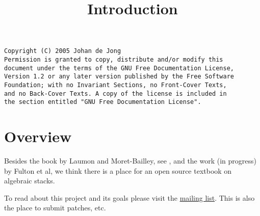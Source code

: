 

%


\title{Introduction}


\maketitle

\begin{verbatim}
Copyright (C) 2005 Johan de Jong
Permission is granted to copy, distribute and/or modify this
document under the terms of the GNU Free Documentation License,
Version 1.2 or any later version published by the Free Software
Foundation; with no Invariant Sections, no Front-Cover Texts,
and no Back-Cover Texts. A copy of the license is included in
the section entitled "GNU Free Documentation License".
\end{verbatim}

\tableofcontents

\section{Overview}
\label{section-overview}

\noindent
Besides the book by Laumon and Moret-Bailley, see \cite{LM-B}, and the work
(in progress) by Fulton et al, we think there is a place for an open source
textbook on algebraic stacks.

\medskip\noindent
To read about this project and its goals please visit the
\href{http://www.math.columbia.edu/mailman/listinfo/algebraic_geometry}%
{mailing list}. This is also the place to submit patches, etc.







